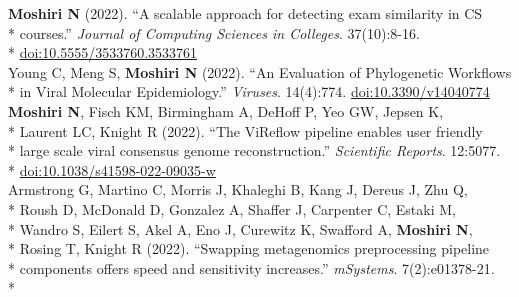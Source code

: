 \documentclass[margin,line]{res}
\begin{document}
\begin{resume}
\hspace*{4mm} \textbf{Moshiri N} (2022). ``A scalable approach for detecting exam similarity in CS\\*
\hspace*{9mm} courses.'' \textit{Journal of Computing Sciences in Colleges}. 37(10):8-16.\\*\vspace{2mm}
\hspace*{8mm} \href{https://dl.acm.org/doi/abs/10.5555/3533760.3533761}{doi:10.5555/3533760.3533761}\\
\hspace*{4mm} Young C, Meng S, \textbf{Moshiri N} (2022). ``An Evaluation of Phylogenetic Workflows\\*\vspace{2mm}
\hspace*{8mm} in Viral Molecular Epidemiology.'' \textit{Viruses}. 14(4):774. \href{https://doi.org/10.3390/v14040774}{doi:10.3390/v14040774}\\
\hspace*{4mm} \textbf{Moshiri N}, Fisch KM, Birmingham A, DeHoff P, Yeo GW, Jepsen K,\\*
\hspace*{9mm} Laurent LC, Knight R (2022). ``The ViReflow pipeline enables user friendly\\*
\hspace*{9mm} large scale viral consensus genome reconstruction.'' \textit{Scientific Reports}. 12:5077.\\*\vspace{2mm}
\hspace*{8mm} \href{https://doi.org/10.1038/s41598-022-09035-w}{doi:10.1038/s41598-022-09035-w}\\
\hspace*{4mm} Armstrong G, Martino C, Morris J, Khaleghi B, Kang J, Dereus J, Zhu Q,\\*
\hspace*{9mm} Roush D, McDonald D, Gonzalez A, Shaffer J, Carpenter C, Estaki M,\\*
\hspace*{9mm} Wandro S, Eilert S, Akel A, Eno J, Curewitz K, Swafford A, \textbf{Moshiri N},\\*
\hspace*{9mm} Rosing T, Knight R (2022). ``Swapping metagenomics preprocessing pipeline\\*
\hspace*{9mm} components offers speed and sensitivity increases.'' \textit{mSystems}. 7(2):e01378-21.\\*\vspace{2mm}

\end{resume}
\end{document}

